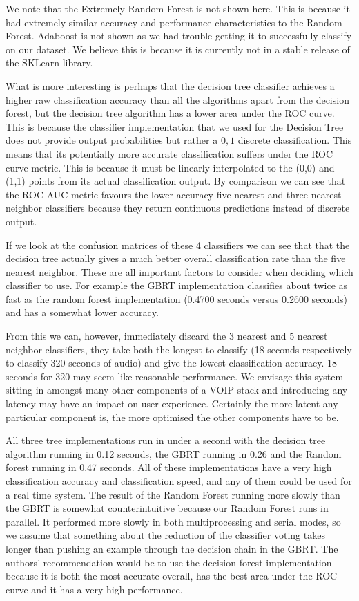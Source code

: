 \documentclass[ %
                    author={Sam Phippen},
                supervisor={Dr. Rafal Bogacz},
                     title={Real time voice activity detectors in noisy personal computing environments},
                  subtitle={},
                    degree={MEng},
                      year={2012} ]{thesis}
\begin{document}
We note that the Extremely Random Forest is not shown here. This is because it
had  extremely similar accuracy and performance characteristics to the Random
Forest. Adaboost is not shown as we had trouble getting it to successfully
classify on our dataset. We believe this is because it is currently not in a
stable release of the SKLearn library.

What is more interesting is perhaps that the decision tree classifier achieves
a higher raw classification accuracy than all the algorithms apart from the
decision forest, but the decision tree algorithm has a lower area under the ROC
curve. This is because the classifier implementation that we used for the
Decision Tree does not provide output probabilities but rather a ${0,1}$
discrete classification. This means that its potentially more accurate
classification suffers under the ROC curve metric. This is because it must be
linearly interpolated to the (0,0) and (1,1) points from its actual
classification output. By comparison we can see that the ROC AUC metric favours
the lower accuracy five nearest and three nearest neighbor classifiers because
they return continuous predictions instead of discrete output.

If we look at the confusion matrices of these 4 classifiers we can see
that that the decision tree actually gives a much better overall classification
rate than the five nearest neighbor. These are all important factors to
consider when deciding which classifier to use. For example the GBRT
implementation classifies about twice as fast as the random forest
implementation (0.4700 seconds versus 0.2600 seconds) and has a somewhat lower
accuracy.

From this we can, however, immediately discard the 3 nearest and 5 nearest
neighbor classifiers, they take both the longest to classify (18 seconds
respectively to classify 320 seconds of audio) and give the lowest
classification accuracy. 18 seconds for 320 may seem like reasonable
performance. We envisage this system sitting in amongst many other components
of a VOIP stack and introducing any latency may have an impact on user
experience. Certainly the more latent any particular component is, the more
optimised the other components have to be.

All three tree implementations run in under a second with the decision tree
algorithm running in 0.12 seconds, the GBRT running in 0.26 and the Random
forest running in 0.47 seconds. All of these implementations have a very high
classification accuracy and classification speed, and any of them could be used
for a real time system. The result of the Random Forest running more slowly
than the GBRT is somewhat counterintuitive because our Random Forest runs in
parallel. It performed more slowly in both multiprocessing and serial
modes, so we assume that something about the reduction of the classifier voting
takes longer than pushing an example through the decision chain in the GBRT.
The authors' recommendation would be to use the decision forest implementation
because it is both the most accurate overall, has the best area under the ROC
curve and it has a very high performance.
\end{document}
